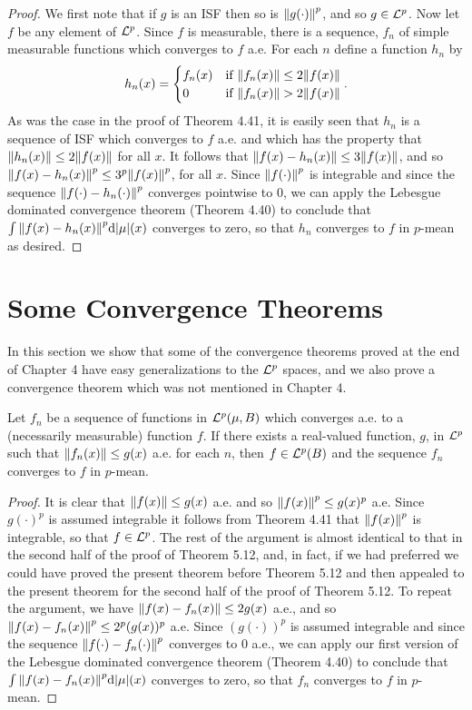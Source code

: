 \begin{proof}
We first note that if $g$ is an ISF then so is $\norm{g(\cdot)}^p$, and so $g\in{\cal L}^p$. Now let $f$ be any element of ${\cal L}^p$. Since $f$ is measurable, there is a sequence, $f_n$ of simple measurable functions which converges to $f$ a.e. For each $n$ define a function $h_n$ by $$h_n(x)=\begin{cases}f_n(x)&\text{if }\norm{f_n(x)}\leq2\norm{f(x)}\\ 0&\text{if }\norm{f_n(x)}>2\norm{f(x)}\end{cases}.$$ As was the case in the proof of Theorem 4.41, it is easily seen that $h_n$ is a sequence of ISF which converges to $f$ a.e. and which has the property that $\norm{h_n(x)}\leq2\norm{f(x)}$ for all $x$. It follows that $\norm{f(x)-h_n(x)}\leq3\norm{f(x)}$, and so $\norm{f(x)-h_n(x)}^p\leq3^p\norm{f(x)}^p$, for all $x$. Since $\norm{f(\cdot)}^p$ is integrable and since the sequence $\norm{f(\cdot)-h_n(\cdot)}^p$ converges pointwise to 0, we can apply the Lebesgue dominated convergence theorem (Theorem 4.40) to conclude that $\int\norm{f(x)-h_n(x)}^p\dd|\mu|(x)$ converges to zero, so that $h_n$ converges to $f$ in $p$-mean as desired.
\end{proof}

\section{Some Convergence Theorems}

In this section we show that some of the convergence theorems proved at the end of Chapter 4 have easy generalizations to the ${\cal L}^p$ spaces, and we also prove a convergence theorem which was not mentioned in Chapter 4.

\begin{theorem}
Let $f_n$ be a sequence of functions in ${\cal L}^p(\mu,B)$ which converges a.e. to a (necessarily measurable) function $f$. If there exists a real-valued function, $g$, in ${\cal L}^p$ such that $\norm{f_n(x)}\leq g(x)$ a.e. for each $n$, then $f\in{\cal L}^p(B)$ and the sequence $f_n$ converges to $f$ in $p$-mean.
\end{theorem}

\begin{proof}
It is clear that $\norm{f(x)}\leq g(x)$ a.e. and so $\norm{f(x)}^p \leq g(x)^p$ a.e. Since $g(\cdot)^p$ is assumed integrable it follows from Theorem 4.41 that $\norm{f(x)}^p$ is integrable, so that $f\in{\cal L}^p$. The rest of the argument is almost identical to that in the second half of the proof of Theorem 5.12, and, in fact, if we had preferred we could have proved the present theorem before Theorem 5.12 and then appealed to the present theorem for the second half of the proof of Theorem 5.12. To repeat the argument, we have $\norm{f(x)-f_n(x)}\leq2g(x)$ a.e., and so $\norm{f(x)-f_n(x)}^p\leq2^p(g(x))^p$ a.e. Since $(g(\cdot))^p$ is assumed integrable and since the sequence $\norm{f(\cdot)-f_n(\cdot)}^p$ converges to 0 a.e., we can apply our first version of the Lebesgue dominated convergence theorem (Theorem 4.40) to conclude that $\int\norm{f(x)-f_n(x)}^p\dd|\mu|(x)$ converges to zero, so that $f_n$ converges to $f$ in $p$-mean.
\end{proof}


